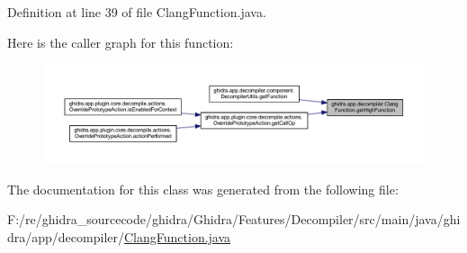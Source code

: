 Definition at line 39 of file Clang\+Function.\+java.

Here is the caller graph for this function\+:
\nopagebreak
\begin{figure}[H]
\begin{center}
\leavevmode
\includegraphics[width=350pt]{classghidra_1_1app_1_1decompiler_1_1_clang_function_af1f2a880d7e39b1df3a611b95ff62910_icgraph}
\end{center}
\end{figure}


The documentation for this class was generated from the following file\+:\begin{DoxyCompactItemize}
\item 
F\+:/re/ghidra\+\_\+sourcecode/ghidra/\+Ghidra/\+Features/\+Decompiler/src/main/java/ghidra/app/decompiler/\mbox{\hyperlink{_clang_function_8java}{Clang\+Function.\+java}}\end{DoxyCompactItemize}
